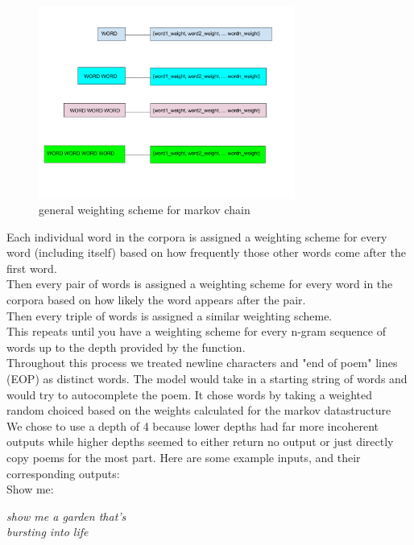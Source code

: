 \documentclass{article} %
\begin{document}
\begin{figure}[h]
  \begin{center}
  \includegraphics[width=0.75\textwidth]{Figs/MARKOV.png}
  \end{center}
  \caption{general weighting scheme for markov chain}
  \label{fig:plot}
  \end{figure}

Each individual word in the corpora is assigned a weighting scheme for every word (including itself) based on how frequently those other words come
after the first word.\\
Then every pair of words is assigned a weighting scheme for every word in the corpora based on how likely the word appears after the pair.\\
Then every triple of words is assigned a similar weighting scheme.\\
This repeats until you have a weighting scheme for every n-gram sequence of words up to the depth provided by the function.\\

Throughout this process we treated newline characters and "end of poem" lines (EOP) as distinct words. The model would take in a starting string of
words and would try to autocomplete the poem. It chose words by taking a weighted random choiced based on the weights calculated for the markov
datastructure\\

We chose to use a depth of 4 because lower depths had far more incoherent outputs while higher depths seemed to either return no output
or just directly copy poems for the most part. Here are some example inputs, and their corresponding outputs:\\


Show me:
\begin{flushleft}
  \textit{
      \hspace{2em} show me a garden that's \\
      \hspace{2em} bursting into life
  }
\end{flushleft}
\end{document}
